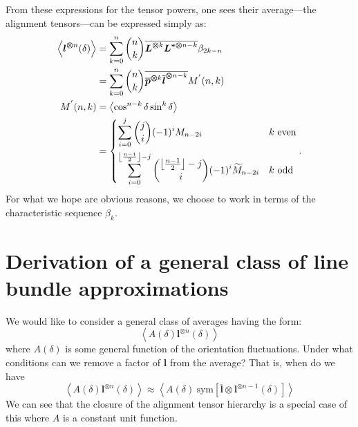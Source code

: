 From these expressions for the tensor powers, one sees their
average---the alignment tensors---can be expressed simply as:
\begin{subequations}
\begin{align}
    \left\langle \boldsymbol{l}^{\boldsymbol{\otimes}n}(\delta) \right\rangle &= \sum_{k = 0}^{n}{{n \choose k} \overline{\boldsymbol{L}^{\boldsymbol{\otimes}k}\boldsymbol{L}^{\boldsymbol{* \otimes}n - k}}\beta_{2k - n}}\\
    &= \sum_{k = 0}^{n}{{n\choose k}\overline{{\overline{\boldsymbol{p}}}^{\boldsymbol{\otimes}k}{\overline{\boldsymbol{l}}}^{\boldsymbol{\otimes}n - k}}M^{'}(n,k)}\\
    M^{'}(n,k) &= \left\langle \cos^{n - k}\delta\sin^{k}\delta \right\rangle\\
&=  \begin{dcases}
\sum_{i = 0}^{j}{{j\choose i}( - 1)^{i}M_{n - 2i}} & k \text{\ even} \\
\sum_{i = 0}^{\left\lfloor \frac{n - 1}{2} \right\rfloor - j}{{\left\lfloor \frac{n - 1}{2} \right\rfloor - j}\choose i}( - 1)^{i}{\widetilde{M}}_{n - 2i} & k \text{\ odd}
\end{dcases}.
\end{align}
\end{subequations}
For what we hope are obvious reasons, we choose to work in terms of the
characteristic sequence \(\beta_{k}\).

\section{Derivation of a general class of line bundle approximations}
We would like to consider a general class of averages having the form: 
\begin{equation}
\left\langle A(\delta)\boldsymbol{l}^{\otimes n}(\delta) \right\rangle \label{eq:MainAv}
\end{equation}
where \(A(\delta)\) is some general function of the orientation
fluctuations. Under what conditions can we remove a factor of
\(\boldsymbol{l}\) from the average? That is, when do we have
\begin{equation}
\left\langle A(\delta)\boldsymbol{l}^{\otimes n}(\delta) \right\rangle\boldsymbol{\approx}\left\langle A(\delta)\ \text{sym}\left\lbrack \overline{\boldsymbol{l}} \otimes \boldsymbol{l}^{\otimes n - 1}(\delta) \right\rbrack \right\rangle \label{eq:LBdef}
\end{equation}
We can see that the closure of the alignment tensor hierarchy is a special case of this where \(A\) is a constant unit function.

